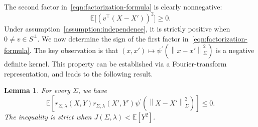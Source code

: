 \documentclass[sn-mathphys-num]{sn-jnl}%
\numberwithin{equation}{section}
\newcommand{\E}{\mathbb{E}}
\newcommand{\norm}[1]{\left\|{#1}\right\|} %
\newtheorem{lemma}{Lemma}
\theoremstyle{thmstyleone}%
\theoremstyle{thmstyletwo}%
\theoremstyle{thmstylethree}%
\begin{document}
The second factor in~\eqref{eqn:factorization-formula} is clearly nonnegative: 
\begin{equation}
	\E\bigl[(v^\top (X-X'))^2\bigr] \ge 0.
\end{equation}
Under assumption~\ref{assumption:independence}, it is strictly positive when $0 \neq v \in S^\perp$. We now determine the sign of the first factor in~\eqref{eqn:factorization-formula}.
The key observation is that $(x, x') \mapsto \psi^\prime(\norm{x-x'}_{\Sigma}^2)$ is a negative definite kernel. This property can be established via a Fourier-transform representation, and leads to the following result.

\vspace{.5em} 
\begin{lemma}
\label{lemma: first-factor-negative}
For every $\Sigma$, we have 
 \begin{equation}
 \label{eqn:first-factor-negative}
 	 \E \left[r_{\Sigma, \lambda}(X, Y) r_{\Sigma, \lambda}(X', Y')  \psi^\prime(\norm{X-X'}_{\Sigma}^2)\right ] \le 0.
 \end{equation} 
 The inequality is strict when $J(\Sigma, \lambda) < \E[Y^2]$. 
\end{lemma} 
\end{document}
